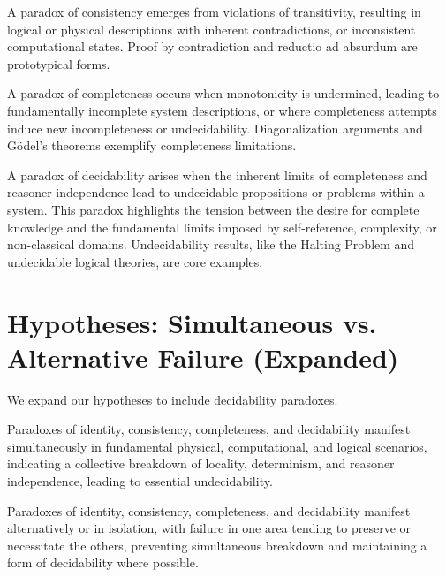 	\begin{definition}
		A paradox of consistency emerges from violations of transitivity, resulting in logical or physical descriptions with inherent contradictions, or inconsistent computational states. Proof by contradiction and reductio ad absurdum are prototypical forms.
	\end{definition}
	
	\begin{definition}
		A paradox of completeness occurs when monotonicity is undermined, leading to fundamentally incomplete system descriptions, or where completeness attempts induce new incompleteness or undecidability. Diagonalization arguments and Gödel's theorems exemplify completeness limitations.
	\end{definition}
	
	\begin{definition}
		A paradox of decidability arises when the inherent limits of completeness and reasoner independence lead to undecidable propositions or problems within a system. This paradox highlights the tension between the desire for complete knowledge and the fundamental limits imposed by self-reference, complexity, or non-classical domains. Undecidability results, like the Halting Problem and undecidable logical theories, are core examples.
	\end{definition}
	
	
	\section{Hypotheses: Simultaneous vs. Alternative Failure (Expanded)}
	
	We expand our hypotheses to include decidability paradoxes.
	
	\begin{hypothesis}
		Paradoxes of identity, consistency, completeness, and decidability manifest simultaneously in fundamental physical, computational, and logical scenarios, indicating a collective breakdown of locality, determinism, and reasoner independence, leading to essential undecidability.
	\end{hypothesis}
	
	\begin{hypothesis}
		Paradoxes of identity, consistency, completeness, and decidability manifest alternatively or in isolation, with failure in one area tending to preserve or necessitate the others, preventing simultaneous breakdown and maintaining a form of decidability where possible.
	\end{hypothesis}
	
